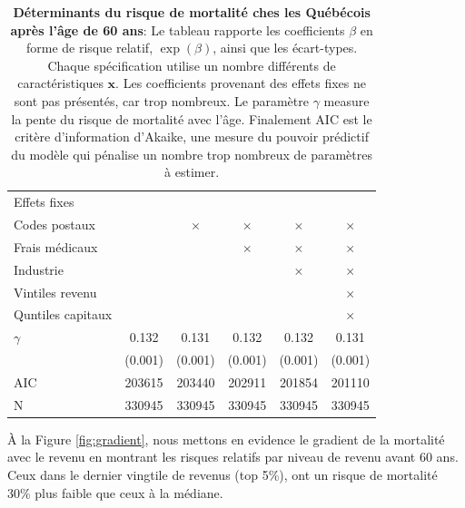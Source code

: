 \documentclass[french, 12pt]{article}
\begin{document}
\begin{table}[!htbp]
\begin{tabular}{lccccc}
						   
		\midrule
		Effets fixes 	   &&&&&\\
		Codes postaux	   & 			& $\times$	& $\times$  & $\times$	& $\times$ \\
		Frais médicaux	   & 			& 			& $\times$  & $\times$	& $\times$ \\
		Industrie	  	   & 			& 			& 		    & $\times$	& $\times$ \\
		Vintiles revenu	   & 	& 	&   & 	& $\times$ \\
		Quntiles capitaux &			& 			& 			& 			& $\times$ \\
		\midrule 
		$\gamma$ 		   & 0.132		& 0.131 	& 0.132 	& 0.132		& 0.131  \\  
						   & (0.001)	& (0.001)	& (0.001)	& (0.001)	& (0.001) \\
		\midrule 
		AIC 			   & 203615		& 203440	& 202911	& 201854	& 201110 \\
		N 				   & 330945 	& 330945 	& 330945 	& 330945 	& 330945 \\
		\bottomrule
		\end{tabular}
		\caption{\textbf{Déterminants du risque de mortalité ches les Québécois après l'âge de 60 ans}: Le tableau rapporte les coefficients $\beta$ en forme de risque relatif, $\exp(\beta)$, ainsi que les écart-types. Chaque spécification utilise un nombre différents de caractéristiques $\mathbf{x}$. Les coefficients provenant des effets fixes ne sont pas présentés, car trop nombreux. Le paramètre $\gamma$ measure la pente du risque de mortalité avec l'âge. Finalement AIC est le critère d'information d'Akaike, une mesure du pouvoir prédictif du modèle qui pénalise un nombre trop nombreux de paramètres à estimer.}
		\label{tab:hazard}
	\end{table}
	
	À la Figure \ref{fig:gradient}, nous mettons en evidence le gradient de la mortalité avec le revenu en montrant les risques relatifs par niveau de revenu avant 60 ans. Ceux dans le dernier vingtile de revenus (top 5\%), ont un risque de mortalité 30\% plus faible que ceux à la médiane. 
	
\end{document}
